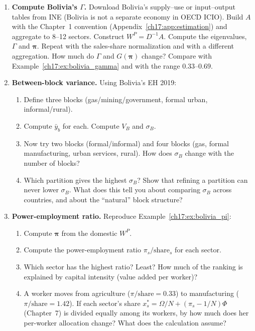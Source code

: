 \documentclass[../structural_economics_book.tex]{subfiles}
\begin{document}
\begin{enumerate}[label=\textbf{17.\arabic*}, leftmargin=3em]

\item \textbf{Compute Bolivia's $\Gamma$.} Download Bolivia's supply--use or input--output tables from INE (Bolivia is not a separate economy in OECD ICIO). Build $A$ with the Chapter~1 convention (Appendix~\ref{ch17:app:estimation}) and aggregate to 8--12 sectors. Construct $W^P = D^{-1}A$. Compute the eigenvalues, $\Gamma$ and $\boldsymbol{\pi}$. Repeat with the sales-share normalization and with a different aggregation. How much do $\Gamma$ and $G(\boldsymbol{\pi})$ change? Compare with Example~\ref{ch17:ex:bolivia_gamma} and with the range $0.33$--$0.69$.

\item \textbf{Between-block variance.}\label{ch17:ex:between} Using Bolivia's EH 2019:
\begin{enumerate}
\item Define three blocks (gas/mining/government, formal urban, informal/rural).
\item Compute $\bar{y}_b$ for each. Compute $V_B$ and $\sigma_B$.
\item Now try two blocks (formal/informal) and four blocks (gas, formal manufacturing, urban services, rural). How does $\sigma_B$ change with the number of blocks?
\item Which partition gives the highest $\sigma_B$? Show that refining a partition can never lower $\sigma_B$. What does this tell you about comparing $\sigma_B$ across countries, and about the ``natural'' block structure?
\end{enumerate}

\item \textbf{Power-employment ratio.} Reproduce Example~\ref{ch17:ex:bolivia_pi}:
\begin{enumerate}
\item Compute $\boldsymbol{\pi}$ from the domestic $W^P$.
\item Compute the power-employment ratio $\pi_s/\text{share}_s$ for each sector.
\item Which sector has the highest ratio? Least? How much of the ranking is explained by capital intensity (value added per worker)?
\item A worker moves from agriculture ($\pi/\text{share} = 0.33$) to manufacturing ($\pi/\text{share} = 1.42$). If each sector's share $x_s^* = \Omega/N + (\pi_s - 1/N)\Phi$ (Chapter~7) is divided equally among its workers, by how much does her per-worker allocation change? What does the calculation assume?
\end{enumerate}


\end{enumerate}
\end{document}
